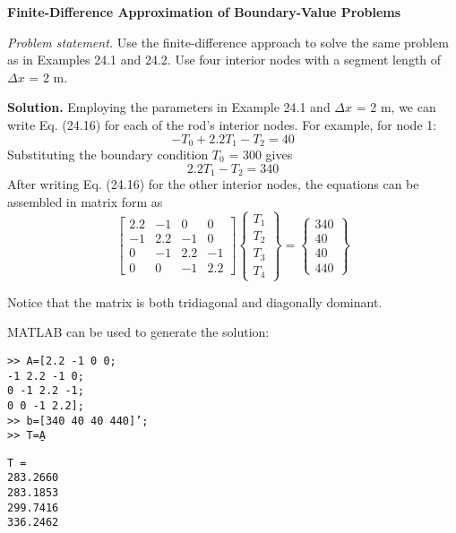 \documentclass[../main.tex]{subfiles}
\begin{document}
\begin{exmp}
    \textbf{Finite-Difference Approximation of Boundary-Value Problems}

    \noindent\textit{Problem statement.} Use the finite-difference approach to solve the same problem as in
    Examples 24.1 and 24.2. Use four interior nodes with a segment length of $\Delta x$ = 2 m.\vspace{\medskipamount}

    \noindent\textbf{Solution.} Employing the parameters in Example 24.1 and $\Delta x$ = 2 m, we can write 
    Eq. (24.16) for each of the rod's interior nodes. For example, for node 1:
    $$
    -T_0+2.2T_1-T_2=40
    $$
    Substituting the boundary condition $T_0$ = 300 gives
    $$
    2.2T_1-T_2=340
    $$
    After writing Eq. (24.16) for the other interior nodes, the equations can be assembled in
    matrix form as 
    \begin{equation} \nonumber
        \left[\begin{array}{cccc}
        2.2 & -1 & 0 & 0 \\
        -1 & 2.2 & -1 & 0 \\
        0 & -1 & 2.2 & -1 \\
        0 & 0 & -1 & 2.2
        \end{array}\right]\left\{\begin{array}{l}
        T_{1} \\
        T_{2} \\
        T_{3} \\
        T_{4}
        \end{array}\right\}=\left\{\begin{array}{c}
        340 \\
        40 \\
        40 \\
        440
        \end{array}\right\}
    \end{equation}

    Notice that the matrix is both tridiagonal and diagonally dominant.

    MATLAB can be used to generate the solution:\vspace*{\smallskipamount}

    \noindent\texttt{>> A=[2.2 -1 0 0;\\
    -1 2.2 -1 0;\\
    0 -1 2.2 -1;\\
    0 0 -1 2.2];\\
    >> b=[340 40 40 440]';\\
    >> T=A\b}\vspace*{\smallskipamount}

    \noindent\texttt{T =\\
    \hspace*{\smallskipamount} 283.2660\\
    \hspace*{\smallskipamount} 283.1853\\
    \hspace*{\smallskipamount} 299.7416\\
    \hspace*{\smallskipamount} 336.2462}
\end{exmp}
\end{document}
